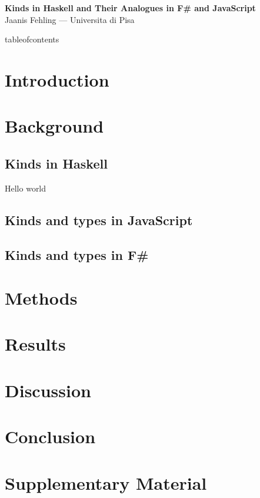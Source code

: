 \documentclass[12pt,oneside,a4paper]{article}
\begin{document}
\begin{center}
{\LARGE\bfseries Kinds in Haskell and Their Analogues in F\# and JavaScript}\\[1ex]
{\small Jaanis Fehling \quad --- \quad Universita di Pisa}\\[2ex]
\end{center}

\begin{abstract}
\end{abstract}

\csname tableofcontents\endcsname
\clearpage

\section{Introduction}

\section{Background}
\subsection{Kinds in Haskell}

Hello world


\subsection{Kinds and types in JavaScript}
\subsection{Kinds and types in F\#}

\section{Methods}

\section{Results}

\section{Discussion}

\section{Conclusion}

\appendix
\section{Supplementary Material}

\printbibliography
\end{document}
